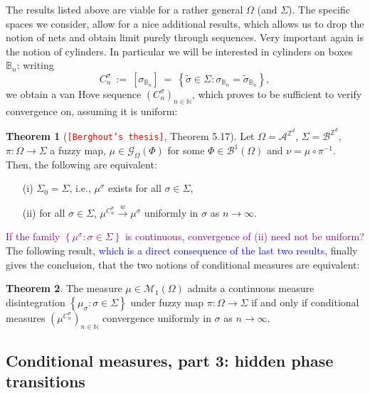 \documentclass[12pt]{article}
\newcommand{\A}{\mathcal{A}}
\newcommand{\B}{\mathcal{B}}
\newcommand{\BB}{\mathscr{B}}
\newcommand{\BBB}{\mathbb{B}}
\newcommand{\G}{\mathcal{G}}
\newcommand{\M}{\mathcal{M}}
\newcommand{\N}{\mathbb{N}}
\newcommand{\Z}{\mathbb{Z}}
\newcommand{\set}[1]{\left\{#1\right\}}
\newcommand{\ra}{\rightarrow}
\newcommand{\1}{\mathbbm{1}}
\newcommand{\5}{\vspace{0.5cm}}
\renewcommand{\tilde}{\widetilde}
\theoremstyle{definition}
\newtheorem{thm}{Theorem}[section]
\begin{document}
The results listed above are viable for a rather general $\Omega$ (and $\Sigma$). The specific spaces we consider, allow for a nice additional results, which allows us to drop the notion of nets and obtain limit purely through sequences. Very important again is the notion of cylinders. In particular we will be interested in cylinders on boxes $\BBB_n$: writing
$$C_n^\sigma ~:=~ [\sigma_{\BBB_n}] ~=~ \set{\tilde{\sigma}\in\Sigma:\sigma_{\BBB_n}=\tilde{\sigma}_{\BBB_n}},$$
we obtain a van Hove sequence $(C_n^\sigma)_{n\in\N}$, which proves to be sufficient to verify convergence on, assuming it is uniform:
\begin{thm}[\textcolor{red}{\texttt{[Berghout's thesis]}}, Theorem 5.17]
Let $\Omega=\A^{\Z^d}$, $\Sigma=\B^{\Z^d}$, $\pi:\Omega\ra\Sigma$ a fuzzy map, $\mu\in\G_\Omega(\Phi)$ for some $\Phi\in\BB^1(\Omega)$ and $\nu=\mu\circ\pi^{-1}$. Then, the following are equivalent:
\begin{itemize}
	\item[(i)] $\Sigma_0=\Sigma$, i.e., $\mu^\sigma$ exists for all $\sigma\in\Sigma$,
	\item[(ii)] for all $\sigma\in\Sigma$, $\mu^{C_n^\sigma}\xrightarrow{w}\mu^\sigma$ uniformly in $\sigma$ as $n\ra\infty$.
\end{itemize}
\end{thm}

\textcolor{purple}{If the family $\set{\mu^\sigma:\sigma\in\Sigma}$ is continuous, convergence of (ii) need not be uniform?} \\

The following result, \textcolor{blue}{which is a direct consequence of the last two results,} finally gives the conclusion, that the two notions of conditional measures are equivalent:
\begin{thm}
The measure $\mu\in\M_1(\Omega)$ admits a continuous measure disintegration $\set{\mu_\sigma:\sigma\in\Sigma}$ under fuzzy map $\pi:\Omega\ra\Sigma$ if and only if conditional measures $(\mu^{C_n^\sigma})_{n\in\N}$ convergence uniformly in $\sigma$ as $n\ra\infty$.
\end{thm}


\subsection{Conditional measures, part 3: hidden phase transitions}
\end{document}
